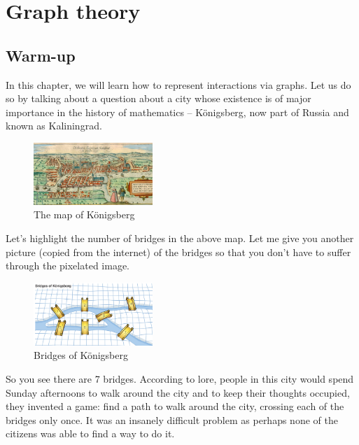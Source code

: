 \chapter{Graph theory}

\section{Warm-up}

In this chapter, we will learn how to represent interactions via graphs.
Let us do so by talking about a question about a city whose existence is of major importance in the history of mathematics -- K\"onigsberg, now part of Russia and known as Kaliningrad.

\begin{figure}[ht]
\centering
\includegraphics[width=0.4\textwidth]{Figures/Konigsberg.jpg}
\caption{ The map of K\"onigsberg } 
\label{fig:konigsberg}
\end{figure}

Let's highlight the number of bridges in the above map.
Let me give you another picture (copied from the internet) of
the bridges so that you don't have to suffer through the pixelated image.


\begin{figure}[ht]
\centering
\includegraphics[width=0.4\textwidth]{Figures/Konigsberg-2}
\caption{ Bridges of K\"onigsberg } 
\label{fig:konigsberg-2}
\end{figure}

So you see there are 7 bridges.
According to lore, people in this city would spend Sunday afternoons to walk around
the city and to keep their thoughts occupied, they invented a game: find a path
to walk around the city, crossing each of the bridges only once.
It was an insanely difficult problem as perhaps none of the citizens was able to find a way to do it.

